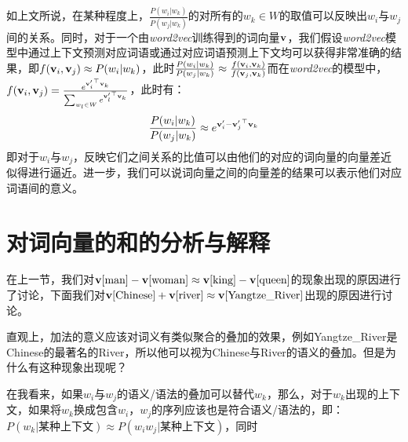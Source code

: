 如上文所说，在某种程度上，$\frac{P(w_i|w_k)}{P(w_j|w_k)}$的对所有的$w_k \in W$的取值可以反映出$w_i$与$w_j$间的关系。同时，对于一个由\emph{word2vec}训练得到的词向量${{\mathbf v}}$，我们假设\emph{word2vec}模型中通过上下文预测对应词语或通过对应词语预测上下文均可以获得非常准确的结果，即$f({{\mathbf v}}_i, {{\mathbf v}}_j) \approx P(w_i|w_k)$，此时$\frac{P(w_i|w_k)}{P(w_j|w_k)}\approx \frac{f({{\mathbf v}}_i, {{\mathbf v}}_k)}{f({{\mathbf v}}_j, {{\mathbf v}}_k)}$而在\emph{word2vec}的模型中，$f({{\mathbf v}}_i, {{\mathbf v}}_j) = \frac{e^{{{{\mathbf v}}'_i}^\top{{\mathbf v}}_k}}{\sum_{w_l \in W}e^{{{{\mathbf v}}'_l}^\top{{\mathbf v}}_k}}$，此时有：
\begin{equation*}
\frac{P(w_i|w_k)}{P(w_j|w_k)}\approx e^{{{{\mathbf v}}'_i-{{\mathbf v}}'_j}^\top{{\mathbf v}}_k}
\end{equation*}
即对于$w_i$与$w_j$，反映它们之间关系的比值可以由他们的对应的词向量的向量差近似得进行逼近。进一步，我们可以说词向量之间的向量差的结果可以表示他们对应词语间的意义。

\section{对词向量的和的分析与解释}

在上一节，我们对${{\mathbf v}}[\mbox{man}]-{{\mathbf v}}[\mbox{woman}] \approx {{\mathbf v}}[\mbox{king}] - {{\mathbf v}}[\mbox{queen}]$的现象出现的原因进行了讨论，下面我们对${{\mathbf v}}[\mbox{Chinese}] + {{\mathbf v}}[\mbox{river}] \approx {{\mathbf v}}[\mbox{Yangtze\_River}]$出现的原因进行讨论。

直观上，加法的意义应该对词义有类似聚合的叠加的效果，例如Yangtze\_River是Chinese的最著名的River，所以他可以视为Chinese与River的语义的叠加。但是为什么有这种现象出现呢？

在我看来，如果$w_i$与$w_j$的语义/语法的叠加可以替代$w_k$，那么，对于$w_k$出现的上下文，如果将$w_k$换成包含$w_i$，$w_j$的序列应该也是符合语义/语法的，即：$P(w_k|某种上下文) \approx P(w_iw_j|某种上下文)$，同时